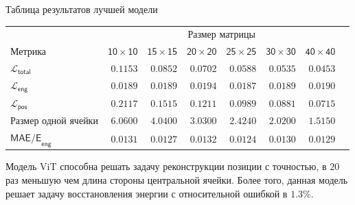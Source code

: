 \documentclass[9pt]{beamer}
\begin{document}
\begin{frame}{Таблица результатов лучшей модели}
    \begin{table}
        \footnotesize
        \centering
        \begin{tabular}{lrrrrrrr}
            \toprule
            {} & \multicolumn{6}{c}{\textsf{Размер матрицы}} \\
            \cmidrule(lr){2-7}
            \textsf{Метрика} & $\mathsf{10 \times 10}$ &  $\mathsf{15 \times 15}$ &  $\mathsf{20 \times 20}$ &  $\mathsf{25 \times 25}$ &  $\mathsf{30 \times 30}$ &  $\mathsf{40 \times 40}$ \\
            \midrule
            $\mathcal{L}_{\mathsf{total}}$ & $\mathsf{0.1153}$ & $\mathsf{0.0852}$ & $\mathsf{0.0702}$ & $\mathsf{0.0588}$ & $\mathsf{0.0535}$ & $\mathsf{0.0453}$ \\
            $\mathcal{L}_{\mathsf{eng}}$ & $\mathsf{0.0189}$ & $\mathsf{0.0189}$ & $\mathsf{0.0194}$ & $\mathsf{0.0187}$ & $\mathsf{0.0189}$ & $\mathsf{0.0190}$ \\
            $\mathcal{L}_{\mathsf{pos}}$ & $\mathsf{0.2117}$ & $\mathsf{0.1515}$ & $\mathsf{0.1211}$ & $\mathsf{0.0989}$ & $\mathsf{0.0881}$ & $\mathsf{0.0715}$ \\
            \textsf{Размер одной ячейки} & $\mathsf{6.0600}$ & $\mathsf{4.0400}$ & $\mathsf{3.0300}$ & $\mathsf{2.4240}$ & $\mathsf{2.0200}$ & $\mathsf{1.5150}$ \\
            $\textsf{MAE/E}_{\textsf{eng}}$ & $\mathsf{0.0131}$ & $\mathsf{0.0127}$ & $\mathsf{0.0132}$ & $\mathsf{0.0124}$ & $\mathsf{0.0130}$ & $\mathsf{0.0129}$ \\        
            \bottomrule
        \end{tabular}
    \end{table}

    \begin{block}{}
        Модель \textsf{ViT} способна решать задачу реконструкции позиции с точностью, в $20$ раз меньшую чем длина стороны центральной ячейки. Более того, данная модель решает задачу восстановления энергии с относительной ошибкой в $1.3\%$.
    \end{block}
\end{frame}
\end{document}
